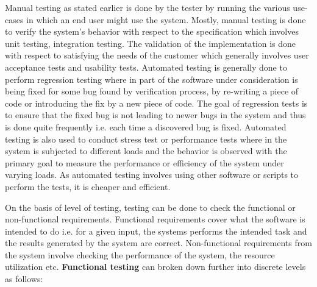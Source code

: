 Manual testing as stated earlier is done by the tester by running the various use-cases in which an end user might use the system. Mostly, manual testing is done to verify the system's behavior with respect to the specification which involves unit testing, integration testing. The validation of the implementation is done with respect to satisfying the needs of the customer which generally involves user acceptance tests and usability tests. Automated testing is generally done to perform regression testing where in part of the software under consideration is being fixed for some bug found by verification process, by re-writing a piece of code or introducing the fix by a new piece of code. The goal of regression tests is to ensure that the fixed bug is not leading to newer bugs in the system and thus is done quite frequently i.e. each time a discovered bug is fixed. Automated testing is also used to conduct stress test or performance tests where in the system is subjected to different loads and the behavior is observed with the primary goal to measure the performance or efficiency of the system under varying loads. As automated testing involves using other software or scripts to perform the tests, it is cheaper and efficient. \newline 

On the basis of level of testing, testing can be done to check the functional or non-functional requirements. Functional requirements cover what the software is intended to do i.e. for a given input, the systems performs the intended task and the results generated by the system are correct. Non-functional requirements from the system involve checking the performance of the system, the resource utilization etc. \textbf{Functional testing} can broken down further into discrete levels as follows: 

